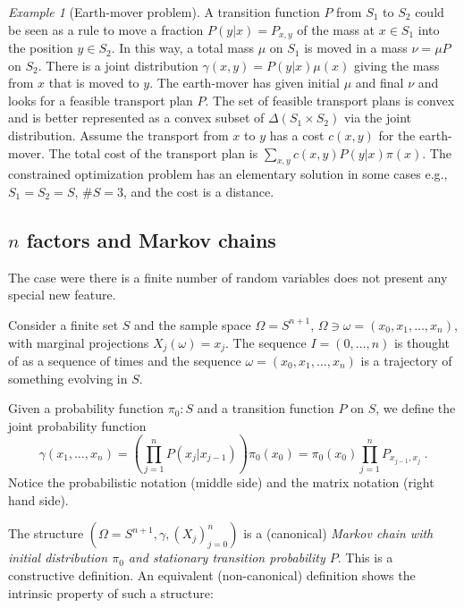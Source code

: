 \documentclass[12pt,a4paper]{amsart}
\theoremstyle{plain}%
\theoremstyle{definition}
\theoremstyle{remark}
\newtheorem{example}{Example}
\begin{document}
\begin{example}[Earth-mover problem]
  A transition function $P$ from $S_1$ to $S_2$ could be seen as a rule to move a fraction $P(y|x) = P_{x,y}$ of the  mass at $x \in S_1$ into the position $y \in S_2$. In this way, a total mass $\mu$ on $S_1$ is moved in a mass $\nu = \mu P$ on $S_2$. There is a joint distribution $\gamma(x,y) = P(y|x)\mu(x)$ giving the mass from $x$ that is moved to $y$. The earth-mover has given initial $\mu$ and final $\nu$ and looks for a feasible transport plan $P$. The set of feasible transport plans is convex and is better represented as a convex subset of $\Delta(S_1 \times S_2)$ via the joint distribution. Assume the transport from $x$ to $y$ has a cost $c(x,y)$ for the earth-mover. The total cost of the transport plan is $\sum_{x,y} c(x,y)P(y|x)\pi(x)$. The constrained optimization problem has an elementary solution in some cases e.g., $S_1=S_2=S$, $\#S = 3$, and the cost is a distance. 
\end{example}
  
\subsection{$n$ factors and Markov chains}
\label{sec:n-factors}
The case were there is a finite number of random variables does not present any special new feature.

Consider a finite set $S$ and the sample space $\Omega = S^{n+1}$, $\Omega \ni \omega=(x_0,x_1,\dots,x_n)$, with marginal projections $X_j(\omega) = x_j$. The sequence $I = (0,\dots,n)$ is thought of as a sequence of times and the sequence $\omega=(x_0,x_1,\dots,x_n)$ is a trajectory of something evolving in $S$.

Given a probability function $\pi_0 \colon S$ and a transition function $P$ on $S$, we define the joint probability function
\begin{equation*}
  \gamma(x_1,\dots,x_n) = \left(\prod_{j=1}^n P(x_j|x_{j-1})\right) \pi_0(x_0) = \pi_0(x_0) \prod_{j=1}^n P_{x_{j-1},x_j} \ .
  \end{equation*}
  Notice the probabilistic notation (middle side) and the matrix notation (right hand side).
  
  The structure $(\Omega=S^{n+1},\gamma,(X_j)_{j=0}^n)$ is a (canonical) \emph{Markov chain with initial distribution $\pi_0$ and stationary transition probability $P$}. This is a constructive definition. An equivalent (non-canonical) definition shows the intrinsic property of such a structure:
\end{document}
